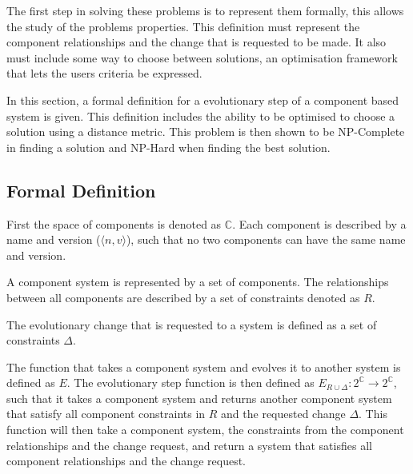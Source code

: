 The first step in solving these problems is to represent them formally, this allows the study of the problems properties.
This definition must represent the component relationships and the change that is requested to be made. 
It also must include some way to choose between solutions, an optimisation framework that lets the users criteria be expressed.

In this section, a formal definition for a evolutionary step of a component based system is given.
This definition includes the ability to be optimised to choose a solution using a distance metric.
This problem is then shown to be NP-Complete in finding a solution and NP-Hard when finding the best solution.

\subsection{Formal Definition}
First the space of components is denoted as $\mathbb{C}$.
Each component is described by a name and version ($\langle n, v\rangle$), such that no two components can have the same name and version.

A component system is represented by a set of components.
The relationships between all components are described by a set of constraints denoted as $R$.

The evolutionary change that is requested to a system is defined as a set of constraints $\Delta$.

The function that takes a component system and evolves it to another system is defined as $E$.
The evolutionary step function is then defined as $E_{R \cup \Delta}: 2^\mathbb{C} \rightarrow 2^\mathbb{C}$, 
such that it takes a component system and returns another component system that satisfy all component constraints in $R$ and the requested change $\Delta$.
This function will then take a component system, the constraints from the component relationships and the change request,
and return a system that satisfies all component relationships and the change request.


